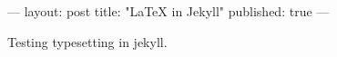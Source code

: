 ---
layout: post
title: "LaTeX in Jekyll"
published: true
---

Testing \latex typesetting in jekyll.
